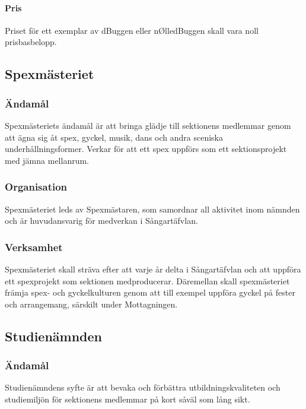 \documentclass{dgovdoc}
\begin{document}
\paragraph{Pris}

Priset för ett exemplar av dBuggen eller nØlledBuggen skall vara noll
prisbasbelopp.

\subsection{Spexmästeriet}

\subsubsection{Ändamål}

Spexmästeriets ändamål är att bringa glädje till sektionens medlemmar genom att
ägna sig åt spex, gyckel, musik, dans och andra sceniska underhållningsformer.
Verkar för att ett spex uppförs som ett sektionsprojekt med jämna mellanrum.

\subsubsection{Organisation}

Spexmästeriet leds av Spexmästaren, som samordnar all aktivitet inom nämnden
och är huvudansvarig för medverkan i Sångartäfvlan.

\subsubsection{Verksamhet}

Spexmästeriet skall sträva efter att varje år delta i Sångartäfvlan och att
uppföra ett spexprojekt som sektionen medproducerar. Däremellan skall
spexmästeriet främja spex- och gyckelkulturen genom att till exempel uppföra
gyckel på fester och arrangemang, särskilt under Mottagningen.

\subsection{Studienämnden}

\subsubsection{Ändamål}

Studienämndens syfte är att bevaka och förbättra utbildningskvaliteten och
studiemiljön för sektionens medlemmar på kort såväl som lång sikt.
\end{document}
